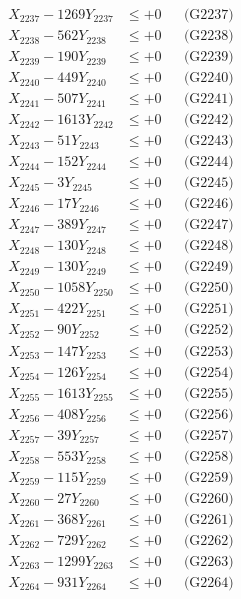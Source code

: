 \documentclass[a4paper,10pt]{article}
\begin{document}
{\begin{align}
X_{2237} - 1269Y_{2237} &\leq +0 && \text{(G2237)} \\
X_{2238} - 562Y_{2238} &\leq +0 && \text{(G2238)} \\
X_{2239} - 190Y_{2239} &\leq +0 && \text{(G2239)} \\
X_{2240} - 449Y_{2240} &\leq +0 && \text{(G2240)} \\
\allowbreak
X_{2241} - 507Y_{2241} &\leq +0 && \text{(G2241)} \\
X_{2242} - 1613Y_{2242} &\leq +0 && \text{(G2242)} \\
X_{2243} - 51Y_{2243} &\leq +0 && \text{(G2243)} \\
X_{2244} - 152Y_{2244} &\leq +0 && \text{(G2244)} \\
X_{2245} - 3Y_{2245} &\leq +0 && \text{(G2245)} \\
X_{2246} - 17Y_{2246} &\leq +0 && \text{(G2246)} \\
X_{2247} - 389Y_{2247} &\leq +0 && \text{(G2247)} \\
X_{2248} - 130Y_{2248} &\leq +0 && \text{(G2248)} \\
X_{2249} - 130Y_{2249} &\leq +0 && \text{(G2249)} \\
X_{2250} - 1058Y_{2250} &\leq +0 && \text{(G2250)} \\
\allowbreak
X_{2251} - 422Y_{2251} &\leq +0 && \text{(G2251)} \\
X_{2252} - 90Y_{2252} &\leq +0 && \text{(G2252)} \\
X_{2253} - 147Y_{2253} &\leq +0 && \text{(G2253)} \\
X_{2254} - 126Y_{2254} &\leq +0 && \text{(G2254)} \\
X_{2255} - 1613Y_{2255} &\leq +0 && \text{(G2255)} \\
X_{2256} - 408Y_{2256} &\leq +0 && \text{(G2256)} \\
X_{2257} - 39Y_{2257} &\leq +0 && \text{(G2257)} \\
X_{2258} - 553Y_{2258} &\leq +0 && \text{(G2258)} \\
X_{2259} - 115Y_{2259} &\leq +0 && \text{(G2259)} \\
X_{2260} - 27Y_{2260} &\leq +0 && \text{(G2260)} \\
\allowbreak
X_{2261} - 368Y_{2261} &\leq +0 && \text{(G2261)} \\
X_{2262} - 729Y_{2262} &\leq +0 && \text{(G2262)} \\
X_{2263} - 1299Y_{2263} &\leq +0 && \text{(G2263)} \\
X_{2264} - 931Y_{2264} &\leq +0 && \text{(G2264)} \\

\end{align}}
\end{document}
